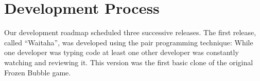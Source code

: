 \section{Development Process}
Our development roadmap scheduled three successive releases. The first release, called ``Waitaha'', was developed using the pair programming technique: While one developer was typing code at least one other developer was constantly watching and reviewing it. This version was the first basic clone of the original Frozen Bubble game.